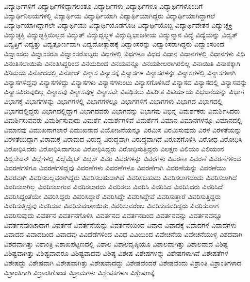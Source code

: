 {ವಿದ್ಯಾರ್ಥಿಗಳಿಗೆ
ವಿದ್ಯಾರ್ಥಿಗಳಿದ್ದಾಗಲಂತೂ
ವಿದ್ಯಾರ್ಥಿಗಳು
ವಿದ್ಯಾರ್ಥಿಗಳೂ
ವಿದ್ಯಾರ್ಥಿಗಳೊಂದಿಗೆ
ವಿದ್ಯಾರ್ಥಿನಿಲಯಗಳಲ್ಲಿ
ವಿದ್ಯಾರ್ಥಿಯ
ವಿದ್ಯಾರ್ಥಿಯಾಗಿ
ವಿದ್ಯಾರ್ಥಿಯಾಗಿದ್ದರು
ವಿದ್ಯಾರ್ಥಿಯಾಗಿದ್ದಾಗಲೆ
ವಿದ್ಯಾರ್ಥಿಯಾಗಿದ್ದಾಗಲೇ
ವಿದ್ಯಾರ್ಥಿಯು
ವಿದ್ಯಾರ್ಥಿಯೊಡಗೂಡಿ
ವಿದ್ಯಾರ್ಥಿಯೊಬ್ಬ
ವಿದ್ಯಾರ್ಥಿವೇತನ
ವಿದ್ಯುಚ್ಚಕ್ತಿ
ವಿದ್ಯುಚ್ಛಕ್ತಿ
ವಿದ್ಯುಚ್ಛಕ್ತಿಯಿಲ್ಲದ
ವಿದ್ಯುತ್
ವಿದ್ಯುದ್ಬಲ್ಬ್ಗಳ
ವಿದ್ಯುದ್ವಿಭಾಜಕೀಯ
ವಿದ್ಯುನ್ಮಾನ
ವಿದ್ಯೆ
ವಿದ್ಯೆಯನ್ನು
ವಿದ್ವತ್
ವಿದ್ವತ್ತಿಗೆ
ವಿದ್ವತ್ತು
ವಿದ್ವತ್ಪೂರ್ಣವಾಗಿ
ವಿದ್ವದೋತ್ಸಾಹಕ್ಕೆ
ವಿದ್ವಾಂಸರನ್ನು
ವಿದ್ವಾಂಸರಾಗಿದ್ದರು
ವಿದ್ವಾಂಸರಿಂದ
ವಿದ್ವಾಂಸರು
ವಿದ್ವಾಂಸರೂ
ವಿದ್ವಾಂಸರೊಬ್ಬರು
ವಿಧಗಳಲ್ಲಿ
ವಿಧಗಳೂ
ವಿಧದ
ವಿಧಾನ
ವಿಧಾನಗಳಲ್ಲಿ
ವಿಧಾನಗಳು
ವಿಧಿ
ವಿನಂತಿಸಲಾಯಿತು
ವಿನಂತಿಸಿದ್ದರಿಂದ
ವಿನಯದಿಂದ
ವಿನಯವನ್ನೂ
ವಿನಯಶೀಲರಾಗಿರಲಿಲ್ಲ
ವಿನಾಯಿತಿ
ವಿನಾಶಕ್ಕಾಗಿ
ವಿನಿಮಯ
ವಿನೋದದಲ್ಲಿ
ವಿನೋದ್
ವಿನ್ಯಾಸ
ವಿನ್ಯಾಸಕ್ಕೆ
ವಿನ್ಯಾಸಗಳ
ವಿನ್ಯಾಸಗಳನ್ನು
ವಿನ್ಯಾಸಗಳಲ್ಲಿ
ವಿನ್ಯಾಸಗಳಾಗಿ
ವಿನ್ಯಾಸಗಳಿದ್ದವು
ವಿನ್ಯಾಸಗಳಿದ್ದು
ವಿನ್ಯಾಸಗಳು
ವಿನ್ಯಾಸಗಳುಂಟು
ವಿನ್ಯಾಸಗೊಳಿಸಿದೆ
ವಿನ್ಯಾಸದ
ವಿನ್ಯಾಸದಲ್ಲಿ
ವಿನ್ಯಾಸವನ್ನು
ವಿನ್ಯಾಸವಿರುವುದಿಲ್ಲ
ವಿನ್ಯಾಸವು
ವಿನ್ಯಾಸವುಳ್ಳ
ವಿನ್ಯಾಸವೇ
ವಿಪಥಿಸಲು
ವಿಪರೀತ
ವಿಪರ್ಯಯ
ವಿಭಜನೆಯನ್ನು
ವಿಭಾಗ
ವಿಭಾಗಕ್ಕೆ
ವಿಭಾಗಗಳನ್ನು
ವಿಭಾಗಗಳಲ್ಲಿ
ವಿಭಾಗಗಳಲ್ಲೂ
ವಿಭಾಗಗಳಿಗೆ
ವಿಭಾಗಗಳು
ವಿಭಾಗದ
ವಿಭಾಗದಲ್ಲಿ
ವಿಭಾಗದಲ್ಲಿದ್ದರು
ವಿಭಾಗದಲ್ಲಿದ್ದಾಗ
ವಿಭಾಗದವರು
ವಿಭಾಗವನ್ನು
ವಿಭಾಗವು
ವಿಭಿನ್ನ
ವಿಮರ್ಶಕರು
ವಿಮರ್ಶಿಸಿದರು
ವಿಮರ್ಶಿಸುವವರು
ವಿಮರ್ಶಿಸುವುದು
ವಿಮರ್ಶೆ
ವಿಮರ್ಶೆಗಳಿವೆ
ವಿಮರ್ಶೆಗೆ
ವಿಮಾನ
ವಿಮಾನಗಳನ್ನೂ
ವಿಮಾನದಲ್ಲಿ
ವಿಮಾನವು
ವಿಮುಖನಾಗಲಾರೆ
ವಿಮುಖನಾದ
ವಿಯೋಜನೆಯನ್ನೂ
ವಿರಮಿಸ
ವಿರಮಿಸುವುದು
ವಿರಳ
ವಿರಳತೆಯನ್ನು
ವಿರಳತೆಯಿದ್ದಾಗ
ವಿರಾಮಕ್ಕೆ
ವಿರಾಮದ
ವಿರುದ್ಧ
ವಿರುದ್ಧವಾಗಿ
ವಿರುದ್ಧವಾಗಿದೆ
ವಿರೂಪಗೊಳಿಸಿ
ವಿರೋಧ
ವಿರೋಧಿಸಿ
ವಿರೋಧಿಸಿದರು
ವಿರೋಧಿಸಿದಾಗಲೂ
ವಿರೋಧಿಸಿದ್ದರು
ವಿರೋಧಿಸುತ್ತಿದ್ದರು
ವಿಲಕ್ಷಣ
ವಿಲಿಯಂ
ವಿಲಿಯಂನ
ವಿಲ್ಲಿಸೇಡನ್
ವಿಲ್ಲೆಗಳಲ್ಲಿ
ವಿಲ್ಲೆಮೈಟ್
ವಿಲ್ಸಸ್
ವಿವರ
ವಿವರಗಳನ್ನು
ವಿವರಗಳು
ವಿವರಣಾ
ವಿವರಣೆ
ವಿವರಣೆಗಳಿಂದ
ವಿವರಣೆಗಳಿಗೂ
ವಿವರಣೆಗಳಿದ್ದವು
ವಿವರಣೆಗಳು
ವಿವರಣೆಗಳೂ
ವಿವರಣೆಗಾಗಿ
ವಿವರಣೆಯನ್ನು
ವಿವರಣೆಯು
ವಿವರವಾಗಿ
ವಿವರಿಸಬಲ್ಲವರಾಗಿದ್ದರು
ವಿವರಿಸಬಹುದಾಗಿದೆ
ವಿವರಿಸಬಹುದು
ವಿವರಿಸಲಾಗದೆಂದು
ವಿವರಿಸಲಾಗಿದೆ
ವಿವರಿಸಲಾಗಿಲ್ಲ
ವಿವರಿಸಲಾಗುವ
ವಿವರಿಸಲಾರದು
ವಿವರಿಸಲು
ವಿವರಿಸಿ
ವಿವರಿಸಿದ
ವಿವರಿಸಿದರು
ವಿವರಿಸಿದೆ
ವಿವರಿಸಿದ್ದಂತೆಯೇ
ವಿವರಿಸಿದ್ದರು
ವಿವರಿಸಿದ್ದಾರೆ
ವಿವರಿಸಿದ್ದೇ
ವಿವರಿಸಿದ್ದೇವೆ
ವಿವರಿಸುತ್ತಾರೆ
ವಿವರಿಸುತ್ತಿದ್ದರು
ವಿವರಿಸುತ್ತಿದ್ದೆವು
ವಿವರಿಸುವ
ವಿವರಿಸುವಂತಾಯಿತು
ವಿವರಿಸುವರೆಂಬ
ವಿವರಿಸುವವರಿದ್ದರು
ವಿವರಿಸುವಾಗ
ವಿವರಿಸುವುದು
ವಿವರ್ತನ
ವಿವರ್ತನಗೊಳಿಸಿ
ವಿವರ್ತನದ
ವಿವರ್ತನದಿಂದ
ವಿವರ್ತನವನ್ನು
ವಿವರ್ತನವನ್ನೂ
ವಿವರ್ತನವುಂಟಾದಾಗ
ವಿವರ್ತನೆ
ವಿವರ್ತನೆಯನ್ನು
ವಿವರ್ತನೆಯಿಂದ
ವಿವಾದ
ವಿವಾದಕ್ಕೆ
ವಿವಾದಗಳ
ವಿವಾದಗಳು
ವಿವಾದದ
ವಿವಾದದಿಂದ
ವಿವಾದವು
ವಿವಿದೆಡೆಗಳಿಂದ
ವಿವಿಧ
ವಿವಿಯಿಂದ
ವಿವೇಚನೆಯ
ವಿವೇಚನೆಯುಳ್ಳ
ವಿಶದವಾಗಿ
ವಿಶದವಾಗಿತ್ತು
ವಿಶಾಂತ್ರಿ
ವಿಶಾಖಪಟ್ಟಣದಲ್ಲಿ
ವಿಶಾಲ
ವಿಶಾಲದೃಷ್ಠಿಯೂ
ವಿಶಾಲವಾಗಿತ್ತು
ವಿಶಾಲವಾದ
ವಿಶಿಷ್ಟ
ವಿಶಿಷ್ಟವಾಗಿತ್ತು
ವಿಶಿಷ್ಟವಾದರೂ
ವಿಶಿಷ್ಟವಾದವು
ವಿಶಿಷ್ಠ
ವಿಶೇಷ
ವಿಶೇಷಗಳನ್ನು
ವಿಶೇಷಗಳಾಗಿವೆ
ವಿಶೇಷತೆಗಳ
ವಿಶೇಷದ್ದು
ವಿಶೇಷವಾಗಿ
ವಿಶೇಷವಾಗಿತ್ತು
ವಿಶೇಷವಾದದ್ದು
ವಿಶೇಷವೆಂದರೆ
ವಿಶೇಷವೆಂದು
ವಿಶ್ರಾಂತಿ
ವಿಶ್ರಾಂತಿಗಳಾದ
ವಿಶ್ರಾಂತಿಗಾಗಿ
ವಿಶ್ರಾಂತಿಗೊಂಡ
ವಿಶ್ರಾಮಗಳು
ವಿಶ್ಲೇಷಕಗಳೂ
ವಿಶ್ಲೇಷಣಕ್ಕೆ
}
